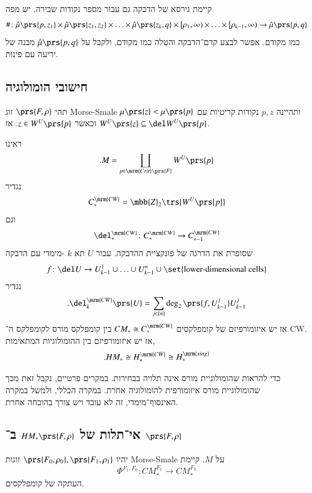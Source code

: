 \documentclass[a4paper,10pt,twoside,openany]{book}
\begin{document}
קיימת גירסא של הדבקה גם עבור מספר נקודות שבירה.
יש מפה
\begin{align*}
\# \colon \hat{\mu}\prs{p,z_1} \times \hat{\mu}\prs{z_1, z_2} \times \ldots \times \hat{\mu}\prs{z_k, q} \times \left[ \rho_1, \infty \right) \times \ldots \times \left[ \rho_{k-1}, \infty \right) \to \hat{\mu}\prs{p,q}
\end{align*}
כמו מקודם.
אפשר לבצע קדם־הדבקה והטלה כמו מקודם, ולקבל על
$\hat{\mu}\prs{p,q}$
מבנה של יריעה עם פינות.

\subsection{חישובי הומולוגיה}

\begin{exercise}
תהי
$\prs{F, \rho}$
זוג
\textenglish{Morse-Smale}
ותהיינה
$p,z$
נקודות קריטיות עם
$\mu\prs{z} < \mu\prs{p}$
וכאשר
$z \in W^U\prs{p}$.
אז
$W^U\prs{z} \subseteq \del W^U\prs{p}$.
\end{exercise}

\begin{exercise}
ראינו
\[\text{.} M = \coprod_{p \in \mrm{Crit}\prs{F}} W^U\prs{p}\]
נגדיר
\[C_*^{\mrm{CW}} = \mbb{Z}_2 \trs{W^U\prs{p}}\]
וגם
\[\del_*^{\mrm{CW}} \colon C_*^{\mrm{CW}} \to C_{* - 1}^{\mrm{CW}}\]
שסופרת את הדרגה של פונקציית ההדבקה.
עבור
$U$
תא
$k$%
-מימדי עם הדבקה
\[f \colon \del U \to U^1_{k-1} \cup \ldots \cup U_{k-1}^n \cup \set{\text{lower-dimensional cells}}\]
נגדיר
\[\text{.} \del_k^{\mrm{CW}}\prs{U} = \sum_{j \in [n]} \deg_2\prs{f, U_{k-1}^j} U_{k-1}^j\]
אז יש איזומורפיזם של קומפלקסים
$CM_* \cong C^{\mrm{CW}}_*$
בין קומפלקס מורס לקומפלקס ה־%
\textenglish{CW}.
אז יש איזומורפיזם בין ההומולוגיות המתאימות,
\[\text{.} HM_* \cong H_*^{\mrm{CW}} \cong H_*^{\mrm{sing}}\]
\end{exercise}

כדי להראות שהומולוגיית מורס אינה תלויה בבחירות. במקרים פרטיים, נקבל זאת מכך שהומולוגיית מורס איזומורפית להומולוגיה אחרת. במקרה הכללי, ולמשל במקרה האינסוף־מימדי, זה לא עובד ויש צורך בהוכחה אחרת.

\subsection{אי־תלות של
$HM_*\prs{F,\rho}$
ב־%
$\prs{F,\rho}$}

\begin{proposition}
יהיו
$\prs{F_0, \rho_0}, \prs{F_1, \rho_1}$
זוגות
\textenglish{Morse-Smale}
על
$M$.
קיימת
\[\Phi^{F_1, F_0} \colon {CM}_*^{F_1} \to CM_*^{F_0}\]
העתקה של קומפלקסים.
\end{proposition}
\end{document}

